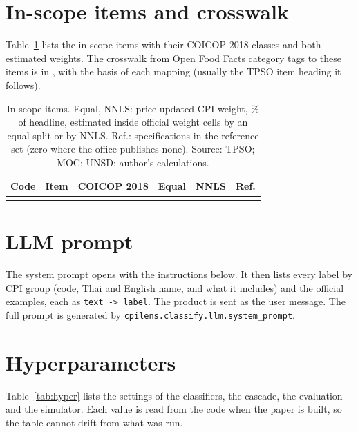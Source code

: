 \section{In-scope items and crosswalk}\label{app:items}

Table~\ref{tab:items} lists the in-scope items with their COICOP 2018 classes and both
estimated weights. The crosswalk from Open Food Facts category tags to these items is in
, with the basis of each mapping (usually the TPSO item heading it follows).

\begin{table}[H]
\centering\small
\caption{In-scope items. Equal, NNLS: price-updated CPI weight, \% of headline, estimated inside
official weight cells by an equal split or by NNLS. Ref.: specifications in the reference
set (zero where the office publishes none). Source: TPSO; MOC; UNSD; author's calculations.}
\label{tab:items}
\begin{tabular}{@{}llp{4.1cm}rrr@{}}
\toprule
Code & Item & COICOP 2018 & Equal & NNLS & Ref. \\
\midrule
{}{generated/items.tex}
\bottomrule
\end{tabular}
\end{table}

\section{LLM prompt}\label{app:prompt}

The system prompt opens with the instructions below. It then lists every label by CPI group
(code, Thai and English name, and what it includes) and the official examples, each as
\texttt{text -> label}. The product is sent as the user message. The full prompt is
generated by \texttt{cpilens.classify.llm.system\_prompt}.


\section{Hyperparameters}\label{app:hyper}

Table~\ref{tab:hyper} lists the settings of the classifiers, the cascade, the evaluation and
the simulator. Each value is read from the code when the paper is built, so the table cannot
drift from what was run.

